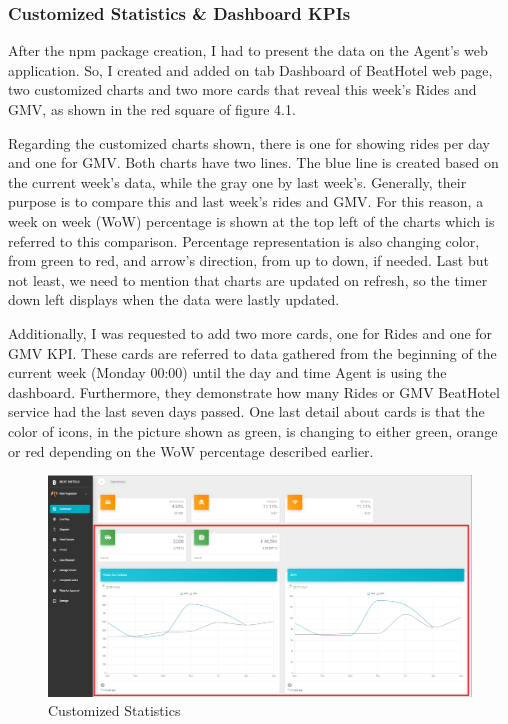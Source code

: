 \subsubsection{Customized Statistics \& Dashboard KPIs}
After the npm package creation, I had to present the data on the Agent's web application. So, I created and added on tab Dashboard of BeatHotel web page, two customized charts and two more cards that reveal this week's Rides and GMV, as shown in the red square of figure 4.1.   \par
Regarding the customized charts shown, there is one for showing rides per day and one for GMV. Both charts have two lines. The blue line is created based on the current week's data, while the gray one by last week's. Generally, their purpose is to compare this and last week's rides and GMV. For this reason, a week on week (WoW) percentage is shown at the top left of the charts which is referred to this comparison. Percentage representation is also changing color, from green to red, and arrow's direction, from up to down, if needed. Last but not least, we need to mention that charts are updated on refresh, so the timer down left displays when the data were lastly updated. \par 
Additionally, I was requested to add two more cards, one for Rides and one for GMV KPI. These cards are referred to data gathered from the beginning of the current week (Monday 00:00) until the day and time Agent is using the dashboard. Furthermore, they demonstrate how many Rides or GMV BeatHotel service had the last seven days passed. One last detail about cards is that the color of icons, in the picture shown as green, is changing to either green, orange or red depending on the WoW percentage described earlier. \par

\begin{figure}[H]
	\begin{center}
		\includegraphics[scale=0.45]{images/my_projects/Statistics/feature-dashboard-statistics.png}
	\end{center}
	\caption{Customized Statistics}
\end{figure}

